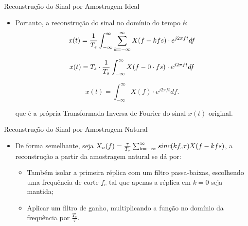 \documentclass{beamer}
\begin{document}
\begin{frame}{Reconstrução do Sinal por Amostragem Ideal}
    \begin{itemize}
        \item Portanto, a reconstrução do sinal no domínio do tempo é:
        \begin{equation}
                    x(t) = {{1}\over {T_s}} \int_{-\infty}^{\infty} \sum_{k=-\infty}^{\infty} X(f-kfs) \cdot e^{j2\pi ft} df
        \end{equation}

        \begin{equation*}
                    x(t) = T_s \cdot {{1}\over {T_s}} \int_{-\infty}^{\infty} X(f-0 \cdot fs) \cdot e^{j2\pi ft} df
        \end{equation*}

        \begin{equation}
                    x(t) = \int_{-\infty}^{\infty} X(f) \cdot e^{j2\pi ft} df.
        \end{equation}

        que é a própria Transformada Inversa de Fourier do sinal $x(t)$ original.
    \end{itemize}
\end{frame}

\begin{frame}{Reconstrução do Sinal por Amostragem Natural}
    \begin{itemize}
        \item De forma semelhante, seja $X_{n}(f) = {{\tau}\over {T_s}} \sum_{k=-\infty}^{\infty} sinc(kf_s \tau) X(f-kfs)$, a reconstrução a partir da amostragem natural se dá por:
            \begin{itemize}
                \item Também isolar a primeira réplica com um filtro passa-baixas, escolhendo uma frequência de corte $f_c$ tal que apenas a réplica em $k=0$ seja mantida;
                \item Aplicar um filtro de ganho, multiplicando a função no domínio da frequência por $\frac{T_s}{\tau}$.
            \end{itemize}
    \end{itemize}
\end{frame}
\end{document}
